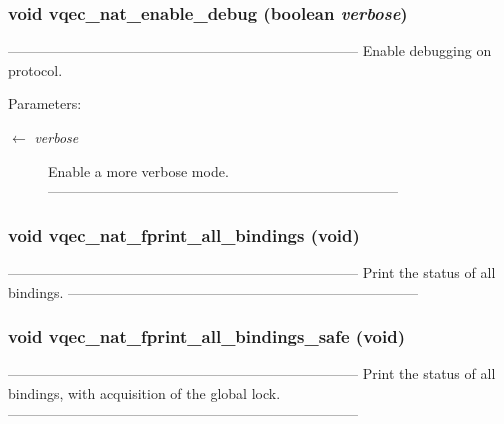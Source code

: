 \subsubsection{\setlength{\rightskip}{0pt plus 5cm}void vqec\_\-nat\_\-enable\_\-debug (boolean {\em verbose})}\label{vqec__nat__api_8c_3ff22996ca5865f197472e49376ff6fc}


--------------------------------------------------------------------------- Enable debugging on protocol.

\begin{Desc}
\item[Parameters:]
\begin{description}
\item[\mbox{$\leftarrow$} {\em verbose}]Enable a more verbose mode. --------------------------------------------------------------------------- \end{description}
\end{Desc}
\subsubsection{\setlength{\rightskip}{0pt plus 5cm}void vqec\_\-nat\_\-fprint\_\-all\_\-bindings (void)}\label{vqec__nat__api_8c_2d793836b5a6eb9960fd6a319a9865ad}


--------------------------------------------------------------------------- Print the status of all bindings. --------------------------------------------------------------------------- 
\subsubsection{\setlength{\rightskip}{0pt plus 5cm}void vqec\_\-nat\_\-fprint\_\-all\_\-bindings\_\-safe (void)}\label{vqec__nat__api_8c_cc358fb4fc880240511b24b1003e9d10}


--------------------------------------------------------------------------- Print the status of all bindings, with acquisition of the global lock. --------------------------------------------------------------------------- 
